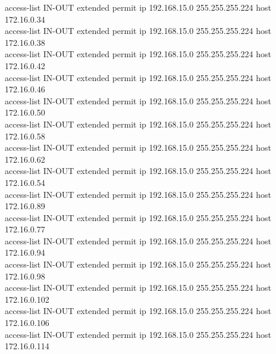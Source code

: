 \documentclass[12pt,a4paper]{report}
\begin{document}
{\hspace*{1cm}access-list IN-OUT extended permit ip 192.168.15.0 255.255.255.224 host 172.16.0.34\\
\hspace*{1cm}access-list IN-OUT extended permit ip 192.168.15.0 255.255.255.224 host 172.16.0.38\\
\hspace*{1cm}access-list IN-OUT extended permit ip 192.168.15.0 255.255.255.224 host 172.16.0.42\\
\hspace*{1cm}access-list IN-OUT extended permit ip 192.168.15.0 255.255.255.224 host 172.16.0.46\\
\hspace*{1cm}access-list IN-OUT extended permit ip 192.168.15.0 255.255.255.224 host 172.16.0.50\\
\hspace*{1cm}access-list IN-OUT extended permit ip 192.168.15.0 255.255.255.224 host 172.16.0.58\\
\hspace*{1cm}access-list IN-OUT extended permit ip 192.168.15.0 255.255.255.224 host 172.16.0.62\\
\hspace*{1cm}access-list IN-OUT extended permit ip 192.168.15.0 255.255.255.224 host 172.16.0.54\\
\hspace*{1cm}access-list IN-OUT extended permit ip 192.168.15.0 255.255.255.224 host 172.16.0.89\\
\hspace*{1cm}access-list IN-OUT extended permit ip 192.168.15.0 255.255.255.224 host 172.16.0.77\\
\hspace*{1cm}access-list IN-OUT extended permit ip 192.168.15.0 255.255.255.224 host 172.16.0.94\\
\hspace*{1cm}access-list IN-OUT extended permit ip 192.168.15.0 255.255.255.224 host 172.16.0.98\\
\hspace*{1cm}access-list IN-OUT extended permit ip 192.168.15.0 255.255.255.224 host 172.16.0.102\\
\hspace*{1cm}access-list IN-OUT extended permit ip 192.168.15.0 255.255.255.224 host 172.16.0.106\\
\hspace*{1cm}access-list IN-OUT extended permit ip 192.168.15.0 255.255.255.224 host 172.16.0.114\\
}
\end{document}
